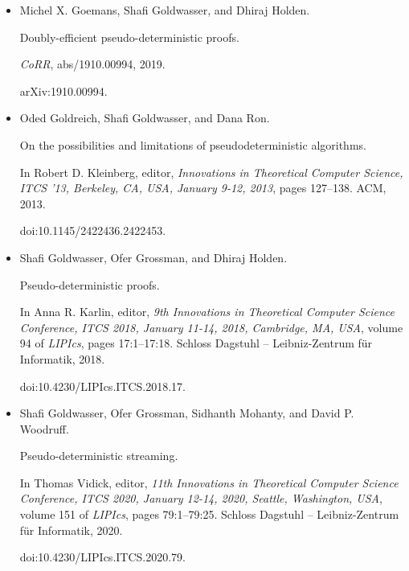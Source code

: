 \documentclass[10pt,a4paper]{article}
\begin{document}
\begin{itemize}
\item[] 
[14]

Michel X. Goemans, Shafi Goldwasser, and Dhiraj Holden.


Doubly-efficient pseudo-deterministic proofs.


\emph{CoRR}, abs/1910.00994, 2019.


arXiv:1910.00994.





\item[] 
[15]

Oded Goldreich, Shafi Goldwasser, and Dana Ron.


On the possibilities and limitations of pseudodeterministic
algorithms.


In Robert D. Kleinberg, editor, \emph{Innovations in Theoretical
Computer Science, ITCS ’13, Berkeley, CA, USA, January 9-12, 2013}, pages
127–138. ACM, 2013.


doi:10.1145/2422436.2422453.





\item[] 
[16]

Shafi Goldwasser, Ofer Grossman, and Dhiraj Holden.


Pseudo-deterministic proofs.


In Anna R. Karlin, editor, \emph{9th Innovations in Theoretical
Computer Science Conference, ITCS 2018, January 11-14, 2018, Cambridge, MA,
USA}, volume 94 of \emph{LIPIcs}, pages 17:1–17:18. Schloss Dagstuhl –
Leibniz-Zentrum für Informatik, 2018.


doi:10.4230/LIPIcs.ITCS.2018.17.





\item[] 
[17]

Shafi Goldwasser, Ofer Grossman, Sidhanth Mohanty, and David P. Woodruff.


Pseudo-deterministic streaming.


In Thomas Vidick, editor, \emph{11th Innovations in Theoretical
Computer Science Conference, ITCS 2020, January 12-14, 2020, Seattle,
Washington, USA}, volume 151 of \emph{LIPIcs}, pages 79:1–79:25. Schloss
Dagstuhl – Leibniz-Zentrum für Informatik,
2020.


doi:10.4230/LIPIcs.ITCS.2020.79.






\end{itemize}
\end{document}
